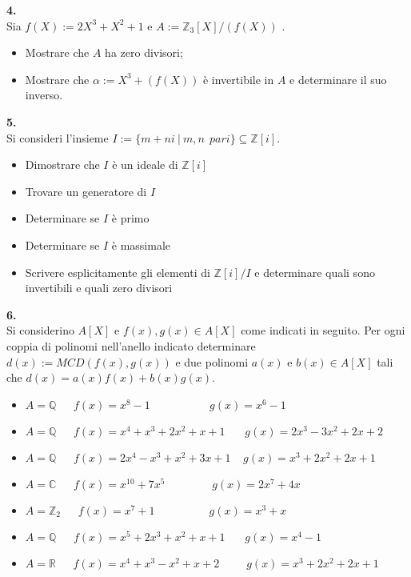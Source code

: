 \documentclass[italian,a4paper,11pt]
{article}
\newcommand{\Q}{\mathbb{Q}}
\newcommand{\Z}{\mathbb Z}
\newcommand{\R}{\mathbb{R}}
\newcommand{\C}{\mathbb{C}}
\newcommand{\acc}{\`}
\begin{document}
\vspace{0.2 cm}
\noindent
\begin{Ex}\textbf{ 4.}\\
Sia $f(X) := 2X^3 + X^2 + 1$ e $A := \Z_3[X]/(f(X))$ .
\begin{itemize}
\item Mostrare che $A$ ha zero divisori;
\item Mostrare che $\alpha := X^3 + (f(X))$ \acc e invertibile in $A$ e determinare il
suo inverso.
\end{itemize}
\end{Ex}

\vspace{0.2 cm}
\noindent
\begin{Ex}\textbf{ 5.}\\
Si consideri l'insieme $I:=\{m+ni \ | \ m,n \ \ pari \}\subseteq \Z[i]$.
\begin{itemize}
 \item Dimostrare che $I$ \acc e un ideale di $\Z[i]$
 \item Trovare un generatore di $I$
 \item Determinare se $I$ \acc e primo
 \item Determinare se $I$ \acc e massimale
 \item Scrivere esplicitamente gli elementi di $\Z[i]/I$ e determinare quali sono invertibili e quali zero divisori
\end{itemize}
\end{Ex}


\vspace{0.4 cm}
\noindent
\begin{Ex}\textbf{ 6.}\\
Si considerino $A[X]$ e $f(x),g(x) \in A[X]$ come indicati in seguito. Per ogni coppia di polinomi nell'anello indicato determinare $d(x):=MCD(f(x),g(x))$ e due polinomi $a(x)$ e $b(x) \in A[X]$ tali che $d(x)=a(x)f(x)+b(x)g(x)$.
\begin{itemize}
 \item $A=\Q \ \ \ \ \ \ \ f(x)=x^8-1  \ \ \ \ \ \ \ \ \ \ \ \ \ \ \ \ \ \ \ \ \ \ \ \ g(x)=x^6-1$
 \item $A=\Q \ \ \ \ \ \ \ f(x)=x^4+x^3+2x^2+x+1  \ \ \ \ \ \ \ \ g(x)=2x^3-3x^2+2x+2$
 \item $A=\Q \ \ \ \ \ \ \ f(x)=2x^4-x^3+x^2+3x+1  \ \ \ \ \ g(x)=x^3+2x^2+2x+1$
 \item $A=\C \ \ \ \ \ \ \ f(x)=x^{10}+7x^5  \ \ \ \ \ \ \ \ \ \ \ \ \ \ \ \ \ \ \ g(x)=2x^7+4x$
 \item $A=\Z_2 \ \ \ \ \ \ \ f(x)=x^7+1  \ \ \ \ \ \ \ \ \ \ \ \ \ \ \ \ \ \ \ \ \ \ g(x)=x^3+x$
 \item $A=\Q \ \ \ \ \ \ \ f(x)=x^5+2x^3+x^2+x+1  \ \ \ \ \ \ \ \ g(x)=x^4-1$
 \item $A=\R \ \ \ \ \ \ \ f(x)=x^4+x^3-x^2+x+2  \ \ \ \ \ \ \ \ \ \ \ g(x)=x^3+2x^2+2x+1$
\end{itemize}
\end{Ex}
\end{document}
